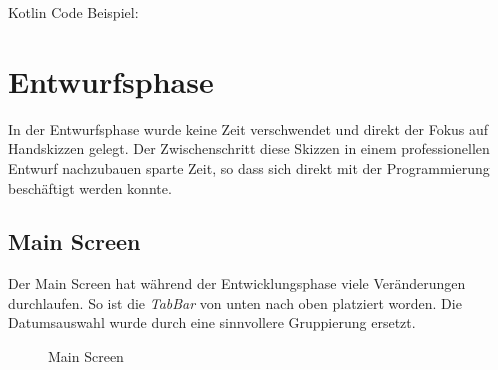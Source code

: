 \documentclass[
    DIV12,
    cleardouble=plain,
    headings=normal,
    pdftex,
    headexclude,footexclude,
    final
]{scrreprt}
\begin{document}
Kotlin Code Beispiel:


\newpage

\chapter{Entwurfsphase}
In der Entwurfsphase wurde keine Zeit verschwendet und direkt der Fokus auf Handskizzen gelegt. Der Zwischenschritt diese Skizzen in einem professionellen Entwurf nachzubauen sparte Zeit, so dass sich direkt mit der Programmierung beschäftigt werden konnte.



\section{Main Screen}
Der Main Screen hat während der Entwicklungsphase viele Veränderungen durchlaufen. So ist die \textit{TabBar} von unten nach oben platziert worden. Die Datumsauswahl wurde durch eine sinnvollere Gruppierung ersetzt.
\begin{figure}[H]
	\centering
	\caption{Main Screen}
	\label{main}
\end{figure}
\end{document}
